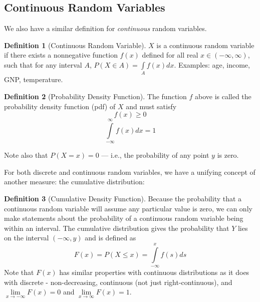 \documentclass[
]{book}
\theoremstyle{definition}
\newtheorem{definition}{Definition}[chapter]
\theoremstyle{definition}
\theoremstyle{definition}
\theoremstyle{remark}
\begin{document}
\hypertarget{continuous-random-variables}{%
\subsection*{Continuous Random Variables}\label{continuous-random-variables}}

We also have a similar definition for \emph{continuous} random variables.

\begin{definition}[Continuous Random Variable]
\protect\hypertarget{def:unnamed-chunk-78}{}{\label{def:unnamed-chunk-78} {} }
\(X\) is a continuous random variable if there exists a nonnegative function \(f(x)\) defined for all real \(x\in (-\infty,\infty)\), such that for any interval \(A\), \(P(X\in A)=\int\limits_A f(x)dx\). Examples: age, income, GNP, temperature.
\end{definition}

\begin{definition}[Probability Density Function]
\protect\hypertarget{def:unnamed-chunk-79}{}{\label{def:unnamed-chunk-79} {} }
The function \(f\) above is called the probability density function (pdf) of \(X\) and must satisfy
\[f(x)\ge 0\]
\[\int\limits_{-\infty}^\infty f(x)dx=1\]

Note also that \(P(X = x)=0\) --- i.e., the probability of any point \(y\) is zero.
\end{definition}

For both discrete and continuous random variables, we have a unifying concept of another measure: the cumulative distribution:

\begin{definition}[Cumulative Density Function]
\protect\hypertarget{def:unnamed-chunk-80}{}{\label{def:unnamed-chunk-80} {} }Because the probability that a continuous random variable will assume any particular value is zero, we can only make statements about the probability of a continuous random variable being within an interval. The cumulative distribution gives the probability that \(Y\) lies on the interval \((-\infty,y)\) and is defined as \[F(x)=P(X\le x)=\int\limits_{-\infty}^x f(s)ds\] Note that \(F(x)\) has similar properties with continuous distributions as it does with discrete - non-decreasing, continuous (not just right-continuous), and \(\lim\limits_{x \to -\infty} F(x) = 0\) and \(\lim\limits_{x \to \infty} F(x) = 1\).
\end{definition}
\end{document}
